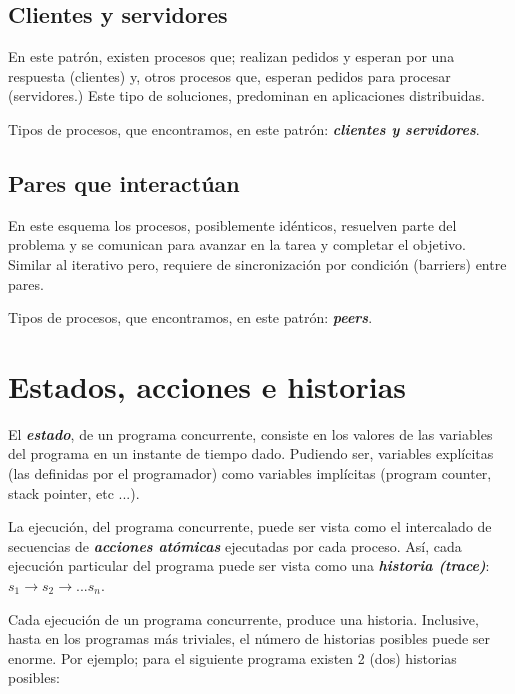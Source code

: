 \documentclass[a4paper, 10pt]{report}
\begin{document}
\subsection{Clientes y servidores}

En este patrón, existen procesos que; realizan pedidos y esperan por una respuesta (clientes) y, otros procesos que, esperan pedidos para procesar (servidores.) Este tipo de soluciones, predominan en aplicaciones distribuidas.

Tipos de procesos, que encontramos, en este patrón: \textbf{\emph{clientes y servidores}}.

\subsection{Pares que interactúan}

En este esquema los procesos, posiblemente idénticos, resuelven parte del problema y se comunican para avanzar en la tarea y completar el objetivo.
Similar al iterativo pero, requiere de sincronización por condición (barriers) entre pares.

Tipos de procesos, que encontramos, en este patrón: \textbf{\emph{peers}}.

\section{Estados, acciones e historias}

El \textbf{\emph{estado}}, de un programa concurrente, consiste en los valores de las variables del programa en un instante de tiempo dado. Pudiendo ser, variables explícitas (las definidas por el programador) como variables implícitas (program counter, stack pointer, etc ...).

La ejecución, del programa concurrente, puede ser vista como el intercalado de secuencias de \textbf{\emph{acciones atómicas}} ejecutadas por cada proceso. Así, cada ejecución particular del programa puede ser vista como una \textbf{\emph{historia (trace)}}: $s_1 \rightarrow s_2 \rightarrow ... s_n$.

Cada ejecución de un programa concurrente, produce una historia. Inclusive, hasta en los programas más triviales, el número de historias posibles puede ser enorme. Por ejemplo; para el siguiente programa existen 2 (dos) historias posibles: 
\end{document}
